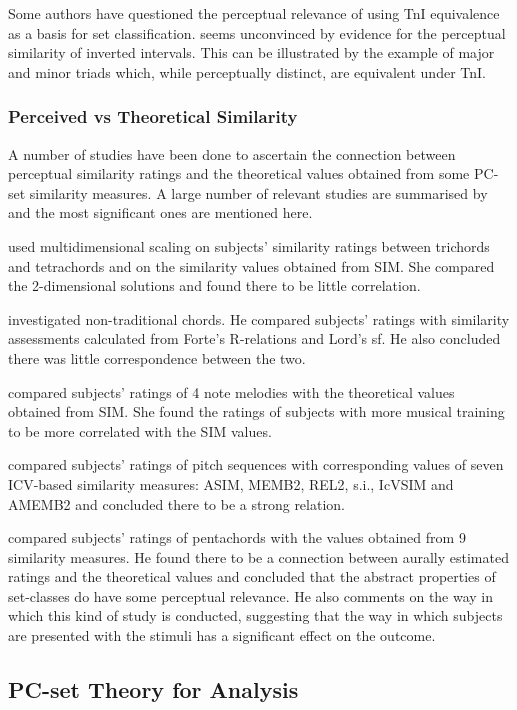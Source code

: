 \documentclass{article}
\begin{document}
Some authors have questioned the perceptual relevance of using TnI
equivalence as a basis for set classification. \citet{Deutsch1982}
seems unconvinced by evidence for the perceptual similarity of
inverted intervals. This can be illustrated by the example of major
and minor triads which, while perceptually distinct, are equivalent
under TnI.
\subsubsection{Perceived vs Theoretical Similarity}
\label{sec-3-5-3}

A number of studies have been done to ascertain the connection between
perceptual similarity ratings and the theoretical values obtained from
some PC-set similarity measures. A large number of relevant studies
are summarised by \citet{Kuusi2001} and the most significant ones are
mentioned here.

\citet{Bruner1984} used multidimensional scaling on subjects'
similarity ratings between trichords and tetrachords and on the
similarity values obtained from SIM. She compared the 2-dimensional
solutions and found there to be little correlation.

\citet{Gibson1986} investigated non-traditional chords. He compared
subjects' ratings with similarity assessments calculated from Forte's
R-relations and Lord's sf. He also concluded there was little
correspondence between the two.

\citet{Stammers1994} compared subjects' ratings of 4 note melodies with
the theoretical values obtained from SIM. She found the ratings of
subjects with more musical training to be more correlated with the SIM
values.

\citet{Lane1997} compared subjects' ratings of pitch sequences with
corresponding values of seven ICV-based similarity measures: ASIM,
MEMB2, REL2, s.i., IcVSIM and AMEMB2 and concluded there to be a
strong relation.

\citet{Kuusi2001} compared subjects' ratings of pentachords with the
values obtained from 9 similarity measures. He found there to be a
connection between aurally estimated ratings and the theoretical
values and concluded that the abstract properties of set-classes do
have some perceptual relevance. He also comments on the way in which
this kind of study is conducted, suggesting that the way in which
subjects are presented with the stimuli has a significant effect on
the outcome.
\subsection{PC-set Theory for Analysis}
\label{sec-3-6}
\end{document}
